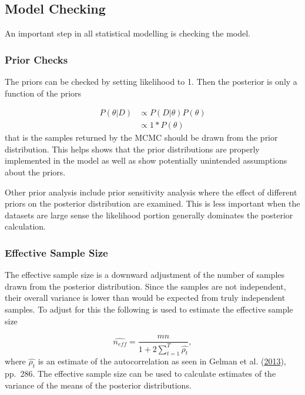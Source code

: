 \documentclass[11pt,a4paper]{article}
\numberwithin{equation}{section}
\begin{document}
\hypertarget{model-checking}{%
\subsection{Model Checking}\label{model-checking}}

An important step in all statistical modelling is checking the model.

\hypertarget{prior-checks}{%
\subsubsection{Prior Checks}\label{prior-checks}}

The priors can be checked by setting likelihood to 1. Then the posterior
is only a function of the priors

\[\begin{aligned} P(\theta|D) & \propto P(D|\theta)P(\theta) \\ & \propto 1*P(\theta)  \end{aligned} \]
that is the samples returned by the MCMC should be drawn from the prior
distribution. This helps shows that the prior distributions are properly
implemented in the model as well as show potentially unintended
assumptions about the priors.

Other prior analysis include prior sensitivity analysis where the effect
of different priors on the posterior distribution are examined. This is
less important when the datasets are large sense the likelihood portion
generally dominates the posterior calculation.

\hypertarget{effective-sample-size}{%
\subsubsection{Effective Sample Size}\label{effective-sample-size}}

The effective sample size is a downward adjustment of the number of
samples drawn from the posterior distribution. Since the samples are not
independent, their overall variance is lower than would be expected from
truly independent samples. To adjust for this the following is used to
estimate the effective sample size

\[ \widehat{n_{eff}} = \frac{mn}{1+ 2\sum_{t=1}^T \widehat{\rho_t}},  \]
where \(\widehat{\rho_t}\) is an estimate of the autocorrelation as seen
in Gelman et al. (\protect\hyperlink{ref-gelman_bayesian_2013}{2013}),
pp.~286. The effective sample size can be used to calculate estimates of
the variance of the means of the posterior distributions.
\end{document}
